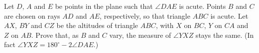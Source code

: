 Let $D$, $A$ and $E$ be points in the plane such that $\angle DAE$ is acute. Points $B$ and $C$ are chosen on rays $AD$ and $AE$, respectively, so that triangle $ABC$ is acute. Let $AX$, $BY$ and $CZ$ be the altitudes of triangle $ABC$, with $X$ on $BC$, $Y$ on $CA$ and $Z$ on $AB$. Prove that, as $B$ and $C$ vary, the measure of $\angle YXZ$ stays the same. (In fact $\angle YXZ=180^\circ-2\angle DAE$.)
